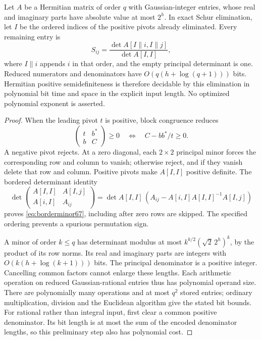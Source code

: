 \begin{lemma}\label{lem:schurminors67}
Let $A$ be a Hermitian matrix of order $q$ with Gaussian-integer entries,
whose real and imaginary parts have absolute value at most $2^h$.
In exact Schur elimination, let $I$ be the ordered indices of the
positive pivots already eliminated. Every remaining entry is
\begin{equation}\label{eq:borderminor67}
 S_{ij}=\frac{\det A[I\mathbin{\|}i,I\mathbin{\|}j]}{\det A[I,I]},
\end{equation}
where $I\mathbin{\|}i$ appends $i$ in that order, and the empty
principal determinant is one. Reduced numerators and denominators
have $O(q(h+\log(q+1)))$ bits. Hermitian positive semidefiniteness is
therefore decidable by this elimination in polynomial bit time and
space in the explicit input length. No optimized polynomial exponent
is asserted.
\end{lemma}
\begin{proof}
When the leading pivot $t$ is positive, block congruence reduces
\[
 \begin{pmatrix}t&b^*\\ b&C\end{pmatrix}\ge0
 \quad\Longleftrightarrow\quad C-bb^*/t\ge0.
\]
A negative pivot rejects. At a zero diagonal, each $2\times2$ principal
minor forces the corresponding row and column to vanish; otherwise
reject, and if they vanish delete that row and column. Positive pivots
make $A[I,I]$ positive definite. The bordered determinant identity
\[
 \det\begin{pmatrix}A[I,I]&A[I,j]\\A[i,I]&A_{ij}\end{pmatrix}
 =\det A[I,I]\,(A_{ij}-A[i,I]A[I,I]^{-1}A[I,j])
\]
proves \eqref{eq:borderminor67}, including after zero rows are skipped.
The specified ordering prevents a spurious permutation sign.

A minor of order $k\le q$ has determinant modulus at most
$k^{k/2}(\sqrt2\,2^h)^k$, by the product of its row norms.
Its real and imaginary parts are integers with
$O(k(h+\log(k+1)))$ bits. The principal denominator is a positive
integer. Cancelling common factors cannot enlarge these lengths.
Each arithmetic operation on reduced Gaussian-rational entries thus
has polynomial operand size. There are polynomially many operations
and at most $q^2$ stored entries; ordinary multiplication, division and
the Euclidean algorithm give the stated bit bounds. For rational
rather than integral input, first clear a common positive denominator.
Its bit length is at most the sum of the encoded denominator lengths,
so this preliminary step also has polynomial cost.
\end{proof}

